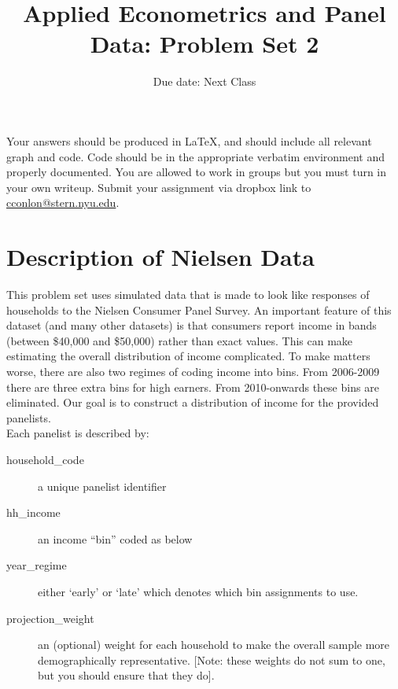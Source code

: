 \documentclass{article}
\title{Applied Econometrics and Panel Data: Problem Set 2}
\begin{document}
\small
\date{Due date: Next Class}
\maketitle
Your answers should be produced in \LaTeX, and should include all relevant graph and code.  Code should be in the appropriate verbatim environment and properly documented. You are allowed to work in groups but you must turn in your own writeup. Submit your assignment via dropbox link to \href{mailto:cconlon@stern.nyu.edu}{cconlon@stern.nyu.edu}.

\section*{\normalsize Description of Nielsen Data}
This problem set uses simulated data that is made to look like responses of households to the Nielsen Consumer Panel Survey. An important feature of this dataset (and many other datasets) is that consumers report income in bands (between \$40,000 and \$50,000) rather than exact values. This can make estimating the overall distribution of income complicated. To make matters worse, there are also two regimes of coding income into bins. From 2006-2009 there are three extra bins for high earners. From 2010-onwards these bins are eliminated. Our goal is to construct a distribution of income for the provided panelists.\\

\noindent Each panelist is described by:
\begin{description}
\item[household\_code] a unique panelist identifier
\item[hh\_income] an income ``bin'' coded as below
\item[year\_regime] either `early' or `late' which denotes which bin assignments to use.
\item[projection\_weight] an (optional) weight for each household to make the overall sample more demographically representative. [Note: these weights do not sum to one, but you should ensure that they do].
\end{description}
\end{document}
